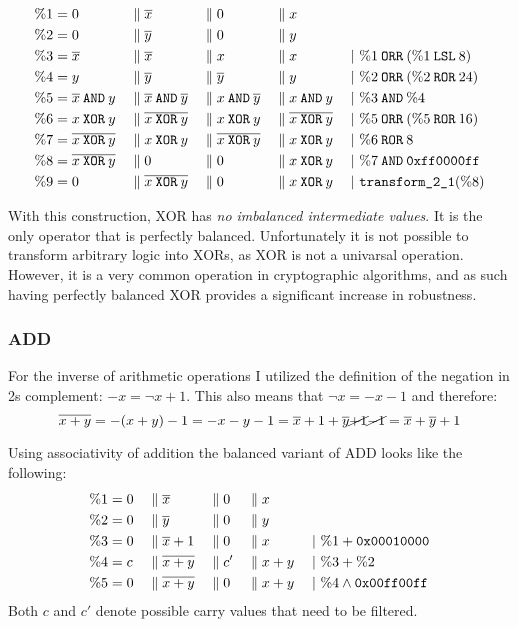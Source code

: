 \begin{align*}
  \binp{1}{0}{\neg{x}}{0}{x}\\
  \binp{2}{0}{\neg{y}}{0}{y}\\
  \btrans{3}{\neg{x}}{\neg{x}}{x}{x}{\%1 \borr (\%1 \blsl 8)}\\
  \btrans{4}{y}{\neg{y}}{\neg{y}}{y}{\%2 \borr (\%2 \bror 24)}\\
  \btrans{5}{\neg{x} \band y}{\neg{x} \band \neg{y}}{x \band \neg{y}}{x \band y}{\%3 \band \%4}\\
  \btrans{6}{x \bxor y}{\neg{x \bxor y}}{x \bxor y}{\neg{x \bxor y}}{\%5 \borr (\%5 \bror 16)}\\
  \btrans{7}{\neg{x \bxor y}}{x \bxor y}{\neg{x \bxor y}}{x \bxor y}{\%6 \bror 8}\\
  \btrans{8}{\neg{x \bxor y}}{0}{0}{x \bxor y}{\%7 \band \hex{ff0000ff}}\\
  \btrans{9}{0}{\neg{x \bxor y}}{0}{x \bxor y}{\trans21 (\%8)}
\end{align*}

With this construction, XOR has \emph{no imbalanced intermediate values}.
It is the only operator that is perfectly balanced.
Unfortunately it is not possible to transform arbitrary logic into XORs, as XOR is not a univarsal operation.
However, it is a very common operation in cryptographic algorithms, and as such having perfectly balanced XOR provides a significant increase in robustness.

\subsubsection{ADD}
For the inverse of arithmetic operations I utilized the definition of the negation in 2s complement: $-x = \neg{x} + 1$.
This also means that $\neg{x} = -x - 1$ and therefore:
\begin{equation*}
  \neg{x + y} = - (x + y) - 1 = - x - y - 1 = \neg{x} + 1 + \neg{y} \cancel{+ 1} \cancel{- 1} = \neg{x} + \neg{y} + 1
\end{equation*}

Using associativity of addition the balanced variant of ADD looks like the following:
\begin{align*}
  \%1 &= 0 && \bsep \neg{x} &&\bsep 0 &&\bsep x      &&\\
  \%2 &= 0 && \bsep \neg{y} &&\bsep 0 &&\bsep y      &&\\
  \%3 &= 0 && \bsep \neg{x}+1 &&\bsep 0 &&\bsep x    &&\;|\ \%1 + \hex{00010000}\\
  \%4 &= c && \bsep \neg{x+y} &&\bsep c' &&\bsep x+y &&\;|\ \%3 + \%2\\
  \%5 &= 0 && \bsep \neg{x+y} &&\bsep 0 &&\bsep x+y  &&\;|\ \%4 \land \hex{00ff00ff}
\end{align*}
Both $c$ and $c'$ denote possible carry values that need to be filtered.

